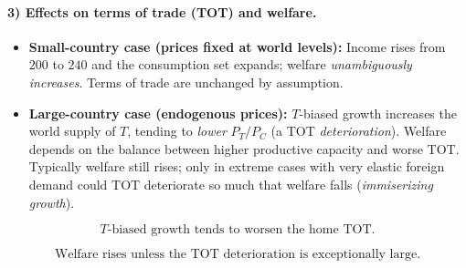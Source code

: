 \documentclass[12pt]{article}
\begin{document}
\paragraph{3) Effects on terms of trade (TOT) and welfare.}
\begin{itemize}[leftmargin=1.2em]
\item \textbf{Small-country case (prices fixed at world levels):} Income rises from $200$ to $240$ and the consumption set expands; welfare \emph{unambiguously increases}. Terms of trade are unchanged by assumption.
\item \textbf{Large-country case (endogenous prices):} $T$-biased growth increases the world supply of $T$, tending to \emph{lower} $P_T/P_C$ (a TOT \emph{deterioration}). Welfare depends on the balance between higher productive capacity and worse TOT. Typically welfare still rises; only in extreme cases with very elastic foreign demand could TOT deteriorate so much that welfare falls (\textit{immiserizing growth}).
\end{itemize}
\[
\boxed{\text{$T$-biased growth tends to worsen the home TOT.}}
\]

\[
\boxed{\text{Welfare rises unless the TOT deterioration is exceptionally large.}}
\]
\end{document}
